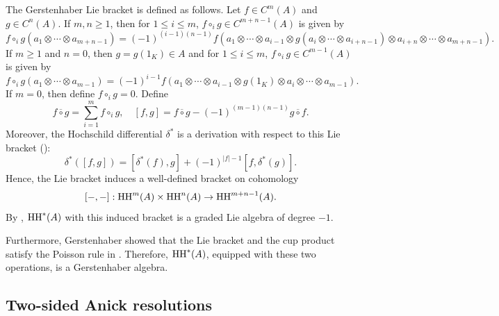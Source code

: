 \documentclass[10pt, reqno]{amsart}
\theoremstyle{definition}
\theoremstyle{remark}
\numberwithin{equation}{section}
\begin{document}
The Gerstenhaber Lie bracket is defined as follows. Let \(f \in C^m(A)\) and \(g \in C^n(A)\). If \(m,n\ge 1\), then for \(1 \le i \le m\), \(f \circ_i g \in C^{m+n-1}(A) \) is given by
\[ f \circ_i g(a_1\otimes\cdots\otimes a_{m+n-1}) =(-1)^{(i-1)(n-1)} f(a_1\otimes\cdots\otimes a_{i-1}\otimes g(a_i\otimes \cdots\otimes a_{i+n-1})\otimes a_{i+n}\otimes \cdots\otimes a_{m+n-1}).\]
If \(m\ge 1\) and \(n=0\), then $g=g(1_K)\in A$ and  for \(1 \le i \le m\), \(f \circ_i g \in C^{m-1}(A) \) is given by
\[ f \circ_i g(a_1\otimes\cdots\otimes a_{m-1}) =(-1)^{i-1} f(a_1\otimes\cdots\otimes a_{i-1}\otimes g(1_K)\otimes a_i\otimes \cdots\otimes a_{m-1}).\]
If \(m=0\), then define \(f \circ_i g =0 \). Define
\[f \overline{\circ} g = \sum_{i=1}^{m}  f \circ_i g, \quad  [f, g] = f \overline{\circ} g - (-1)^{(m-1)(n-1)} g \overline{\circ} f. \]
Moreover, the Hochschild differential \(\delta^*\) is a  derivation with respect to  this Lie bracket (\cite[Page 280]{Ger63}):
\[
\delta^*([f, g]) = [\delta^*(f), g] + (-1)^{|f|-1} [f, \delta^*(g)].
\]
Hence, the Lie bracket induces a well-defined bracket on cohomology
\[
[-,-]: \mathrm{HH}^m(A) \times \mathrm{HH}^n(A) \to \mathrm{HH}^{m+n-1}(A).
\]
By \cite[Theorem 8]{Ger63}, \(\mathrm{HH}^*(A)\) with this induced bracket is a graded Lie algebra of degree \(-1\). 

Furthermore, Gerstenhaber showed that the Lie bracket and the cup product satisfy the Poisson rule in \cite[Section 8]{Ger63}. Therefore, \(\mathrm{HH}^*(A)\), equipped with these two operations, is a Gerstenhaber algebra.

\subsection{Two-sided Anick resolutions}\mbox{}
\end{document}
